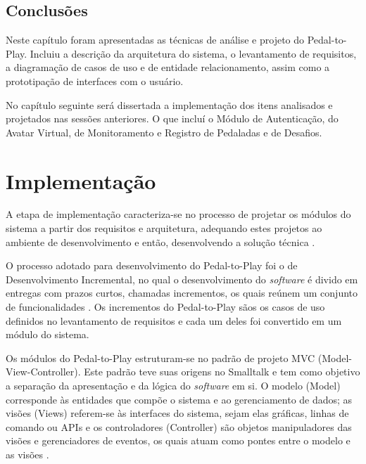 \section{Conclusões}
Neste capítulo foram apresentadas as técnicas de análise e projeto do Pedal-to-Play. Incluiu a descrição da arquitetura do sistema, o levantamento de requisitos, a diagramação de casos de uso e de entidade relacionamento, assim como a prototipação de interfaces com o usuário.
\par
No capítulo seguinte será dissertada a implementação dos itens analisados e projetados nas sessões anteriores. O que incluí o Módulo de Autenticação, do Avatar Virtual, de Monitoramento e Registro de Pedaladas e de Desafios.


\chapter{Implementação} \label{cap:desenv}
A etapa de implementação caracteriza-se no processo de projetar os módulos do sistema a partir dos requisitos e arquitetura, adequando estes projetos ao ambiente de desenvolvimento e então, desenvolvendo a solução técnica \cite{openupDevelopment}. 
\par
O processo adotado para desenvolvimento do Pedal-to-Play foi o de Desenvolvimento Incremental, no qual o desenvolvimento do \textit{software} é divido em entregas com prazos curtos, chamadas incrementos, os quais reúnem um conjunto de funcionalidades \cite{sommerville2003engenharia}. Os incrementos do Pedal-to-Play sãos os casos de uso definidos no levantamento de requisitos e cada um deles foi convertido em um módulo do sistema.
\par
Os módulos do Pedal-to-Play estruturam-se no padrão de projeto MVC (Model-View-Controller). Este padrão teve suas origens no Smalltalk e tem como objetivo a separação da apresentação e da lógica do \textit{software} em si. O modelo (Model) corresponde às entidades que compõe o sistema e ao gerenciamento de dados; as visões (Views) referem-se às interfaces do sistema, sejam elas gráficas, linhas de comando ou APIs e os controladores (Controller) são objetos manipuladores das visões e gerenciadores de eventos, os quais atuam como pontes entre o modelo e as visões \cite{burbeck1992applications}. 

